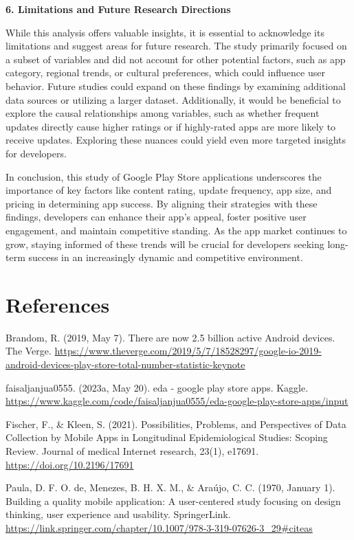 \documentclass[
]{article}
\begin{document}
\textbf{6. Limitations and Future Research Directions}

While this analysis offers valuable insights, it is essential to
acknowledge its limitations and suggest areas for future research. The
study primarily focused on a subset of variables and did not account for
other potential factors, such as app category, regional trends, or
cultural preferences, which could influence user behavior. Future
studies could expand on these findings by examining additional data
sources or utilizing a larger dataset. Additionally, it would be
beneficial to explore the causal relationships among variables, such as
whether frequent updates directly cause higher ratings or if
highly-rated apps are more likely to receive updates. Exploring these
nuances could yield even more targeted insights for developers.

In conclusion, this study of Google Play Store applications underscores
the importance of key factors like content rating, update frequency, app
size, and pricing in determining app success. By aligning their
strategies with these findings, developers can enhance their app's
appeal, foster positive user engagement, and maintain competitive
standing. As the app market continues to grow, staying informed of these
trends will be crucial for developers seeking long-term success in an
increasingly dynamic and competitive environment.

\section{\texorpdfstring{\textbf{References}}{References}}\label{references}

Brandom, R. (2019, May 7). There are now 2.5 billion active Android
devices. The Verge.
\url{https://www.theverge.com/2019/5/7/18528297/google-io-2019-android-devices-play-store-total-number-statistic-keynote}

faisaljanjua0555. (2023a, May 20). eda - google play store apps. Kaggle.
\url{https://www.kaggle.com/code/faisaljanjua0555/eda-google-play-store-apps/input}

Fischer, F., \& Kleen, S. (2021). Possibilities, Problems, and
Perspectives of Data Collection by Mobile Apps in Longitudinal
Epidemiological Studies: Scoping Review. Journal of medical Internet
research, 23(1), e17691. \url{https://doi.org/10.2196/17691}

Paula, D. F. O. de, Menezes, B. H. X. M., \& Araújo, C. C. (1970,
January 1). Building a quality mobile application: A user-centered study
focusing on design thinking, user experience and usability.
SpringerLink.
\url{https://link.springer.com/chapter/10.1007/978-3-319-07626-3_29\#citeas}
\end{document}
